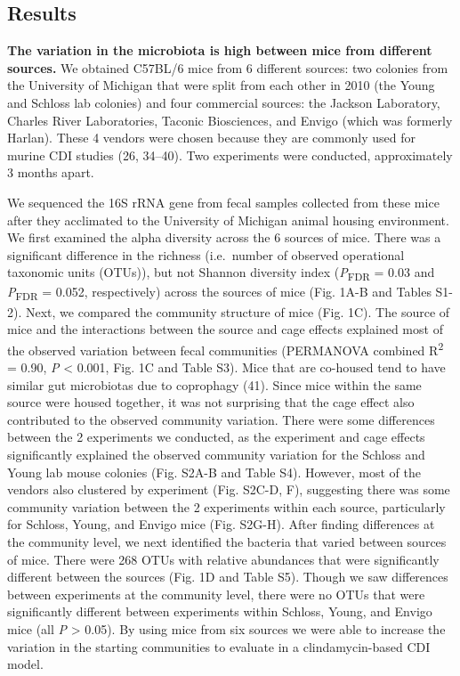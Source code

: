 \documentclass[
  11pt,
]{article}
\begin{document}
\hypertarget{results}{%
\subsection{Results}\label{results}}

\textbf{The variation in the microbiota is high between mice from
different sources.} We obtained C57BL/6 mice from 6 different sources:
two colonies from the University of Michigan that were split from each
other in 2010 (the Young and Schloss lab colonies) and four commercial
sources: the Jackson Laboratory, Charles River Laboratories, Taconic
Biosciences, and Envigo (which was formerly Harlan). These 4 vendors
were chosen because they are commonly used for murine CDI studies (26,
34--40). Two experiments were conducted, approximately 3 months apart.

We sequenced the 16S rRNA gene from fecal samples collected from these
mice after they acclimated to the University of Michigan animal housing
environment. We first examined the alpha diversity across the 6 sources
of mice. There was a significant difference in the richness (i.e.~number
of observed operational taxonomic units (OTUs)), but not Shannon
diversity index (\emph{P}\textsubscript{FDR} = 0.03 and
\emph{P}\textsubscript{FDR} = 0.052, respectively) across the sources of
mice (Fig. 1A-B and Tables S1-2). Next, we compared the community
structure of mice (Fig. 1C). The source of mice and the interactions
between the source and cage effects explained most of the observed
variation between fecal communities (PERMANOVA combined
R\textsuperscript{2} = 0.90, \emph{P} \textless{} 0.001, Fig. 1C and
Table S3). Mice that are co-housed tend to have similar gut microbiotas
due to coprophagy (41). Since mice within the same source were housed
together, it was not surprising that the cage effect also contributed to
the observed community variation. There were some differences between
the 2 experiments we conducted, as the experiment and cage effects
significantly explained the observed community variation for the Schloss
and Young lab mouse colonies (Fig. S2A-B and Table S4). However, most of
the vendors also clustered by experiment (Fig. S2C-D, F), suggesting
there was some community variation between the 2 experiments within each
source, particularly for Schloss, Young, and Envigo mice (Fig. S2G-H).
After finding differences at the community level, we next identified the
bacteria that varied between sources of mice. There were 268 OTUs with
relative abundances that were significantly different between the
sources (Fig. 1D and Table S5). Though we saw differences between
experiments at the community level, there were no OTUs that were
significantly different between experiments within Schloss, Young, and
Envigo mice (all \emph{P} \textgreater{} 0.05). By using mice from six
sources we were able to increase the variation in the starting
communities to evaluate in a clindamycin-based CDI model.
\end{document}
